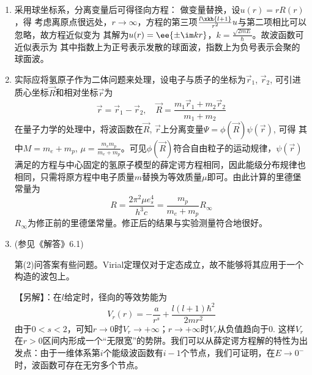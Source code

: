 
\begin{enumerate}[label=\textbf{5.\arabic*}, listparindent=\parindent]

\setcounter{enumi}{0}

\item 采用球坐标系，分离变量后可得径向方程：
做变量替换，设$u(r)=rR(r)$，得
考虑离原点很远处，$r\to\infty$，方程的第三项$\frac{l\xkh{l+1}}{r^2}u$与第二项相比可以忽略，故方程近似变为
其解为$u(r)=\ee{\pm\im kr}$，$k=\frac{\sqrt{2mE}}{\hbar}$。故波函数可近似表示为
其中指数上为正号表示发散的球面波，指数上为负号表示会聚的球面波。


\item 实际应将氢原子作为二体问题来处理，设电子与质子的坐标为$\vec{r}_1$, $\vec{r}_2$, 可引进质心坐标$\vec{R}$和相对坐标$\vec{r}$为
\[\vec{r}=\vec{r}_1-\vec{r}_2,\quad \vec{R}=\frac{m_1\vec{r}_1+m_2\vec{r}_2}{m_1+m_2}\]
在量子力学的处理中，将波函数在$\vec{R}$, $\vec{r}$上分离变量$\Psi=\phi(\vec{R})\psi(\vec{r})$, 可得
其中$M=m_e+m_p$, $\mu=\frac{m_em_p}{m_e+m_p}$。可见$\phi(\vec{R})$符合自由粒子的运动规律，$\psi(\vec{r})$满足的方程与中心固定的氢原子模型的薛定谔方程相同，因此能级分布规律也相同，只需将原方程中电子质量$m$替换为等效质量$\mu$即可。由此计算的里德堡常量为
\[R = \frac{2\pi^2 \mu e_s^4}{h^3 c} = \frac{m_p}{m_e+m_p}R_\infty\]
$R_\infty$为修正前的里德堡常量。修正后的结果与实验测量符合地很好。

\item (参见《解答》6.1) 

第(2)问答案有些问题。Virial定理仅对于定态成立，故不能够将其应用于一个构造的波包上。

\noindent【另解】：在$l$给定时，径向的等效势能为
\[V_r(r) = -\frac{a}{r^s}+\frac{l(l+1)\hbar^2}{2mr^2}\]
由于$0<s<2$，可知$r\rightarrow 0$时$V_r\rightarrow+\infty$；$r\rightarrow +\infty$时$V_r$从负值趋向于0. 这样$V_r$在$r>0$区间内形成一个“无限宽”的势阱。我们可以从薛定谔方程解的特性为出发点：由于一维体系第$i$个能级波函数有$i-1$个节点，我们可证明，在$E\rightarrow 0^-$时，波函数可存在无穷多个节点。


\end{enumerate}
